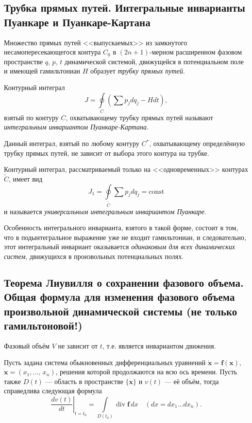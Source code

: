 \documentclass[a4paper]{article}
\begin{document}
\subsection{Трубка прямых путей. Интегральные инварианты Пуанкаре и
Пуанкаре-Картана}
\begin{dfn}
	Множество прямых путей <<выпускаемых>> из замкнутого
	несамопересекающегося контура $C_0$ в $(2n+1)$-мерном расширенном
	фазовом пространстве $q,\,p,\,t$ динамической системой, движущейся
	в потенциальном поле и имеющей гамильтониан $H$ образует \emph{трубку
	прямых путей}.
\end{dfn}
\begin{dfn}
	Контурный интеграл
	\[
		J = \oint\limits_C \left(\sum p_j dq_j - Hdt\right),
	\] 
	 взятый по контуру $C$, охватывающему трубку прямых путей называют
	 \emph{интегральным инвариантом Пуанкаре-Картана}.
\end{dfn}
Данный интеграл, взятый по любому контуру $C^*$, охватывающему определённую
трубку прямых путей, не зависит от выбора этого контура на трубке.
\begin{dfn}
	Контурный интеграл, рассматриваемый только на <<одновременных>>
	контурах $\tilde{C}$, имеет  вид
	\[
		J_1 = \oint\limits_{\tilde{C}} \sum p_j dq_j=\mathrm{const}
	\]
	и называется \emph{универсальным интегральным инвариантом Пуанкаре}.
\end{dfn}
Особенность интегрального инварианта, взятого в такой форме, состоит в том, что
в подынтегральное выражение уже не входит гамильтониан, и следовательно, этот
интегральный инвариант оказывается \emph{одинаковым для всех динамических
систем}, движущихся в произвольных потенциальных полях.
\subsection{Теорема Лиувилля о сохранении фазового объема. Общая формула для
изменения фазового объема произвольной динамической системы (не только
гамильтоновой!)}
\begin{thm}[Лиувилля]
	Фазовый объём $V$ не зависит от $t$, т.\:е. является инвариантом
	движения.
\end{thm}
Пусть задана система обыкновенных дифференциальных уравнений 
$\dot{\mathbf{x}}=\mathbf{f}(\mathbf{x})$, $\mathbf{x}=(x_1,\ldots,\,x_n)$,
решения которой продолжаются на всю ось времени. Пусть также $D(t)$ ---
область в пространстве $\{\mathbf{x}\}$ и $v(t)$ --- её  объём, тогда
справедлива  следующая формула
\[
	\left.\frac{dv(t)}{dt}\right|_{t=t_0}= \int\limits_{D(t_0)}
		\operatorname{div}
		\mathbf{f}\,dx  \quad(dx=dx_1 \ldots dx_n)
.\] 
\end{document}
